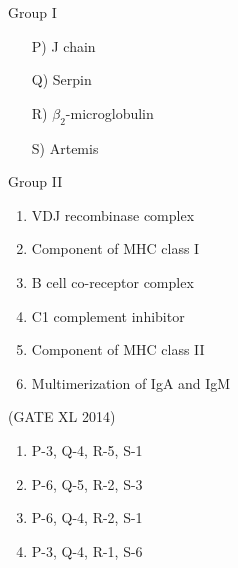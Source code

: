 \documentclass[journal,12pt,onecolumn]{IEEEtran}
\theoremstyle{remark}
\begin{document}
\begin{enumerate}
\begin{minipage}{0.5\textwidth}
Group I
\begin{itemize}
\item[P)] J chain
\item[Q)] Serpin
\item[R)] $\beta_2$-microglobulin
\item[S)] Artemis
\end{itemize}
\end{minipage}
\begin{minipage}{0.45\textwidth}
Group II
\begin{enumerate}
\item VDJ recombinase complex
\item Component of MHC class I
\item B cell co-receptor complex
\item C1 complement inhibitor
\item Component of MHC class II
\item Multimerization of IgA and IgM
\end{enumerate}
\end{minipage}
\hfill (GATE XL 2014)\\
\begin{multicols}{2}
\begin{enumerate}
\item P-3, Q-4, R-5, S-1
\item P-6, Q-5, R-2, S-3
\item P-6, Q-4, R-2, S-1
\item P-3, Q-4, R-1, S-6
\end{enumerate}
\end{multicols}


\end{enumerate}
\end{document}
